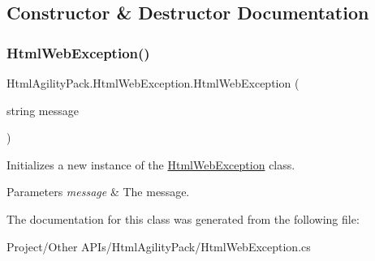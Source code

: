 \subsection{Constructor \& Destructor Documentation}
\mbox{\label{class_html_agility_pack_1_1_html_web_exception_ae1108e56f38e67425517e8c54dd24029}} 
\subsubsection{\texorpdfstring{Html\+Web\+Exception()}{HtmlWebException()}}
{\footnotesize\ttfamily Html\+Agility\+Pack.\+Html\+Web\+Exception.\+Html\+Web\+Exception (\begin{DoxyParamCaption}\item[{string}]{message }\end{DoxyParamCaption})\hspace{0.3cm}{\ttfamily [inline]}}



Initializes a new instance of the \hyperlink{class_html_agility_pack_1_1_html_web_exception}{Html\+Web\+Exception} class. 


\begin{DoxyParams}{Parameters}
{\em message} & The message.\\
\hline
\end{DoxyParams}


The documentation for this class was generated from the following file\+:\begin{DoxyCompactItemize}
\item 
Project/\+Other A\+P\+Is/\+Html\+Agility\+Pack/Html\+Web\+Exception.\+cs\end{DoxyCompactItemize}
